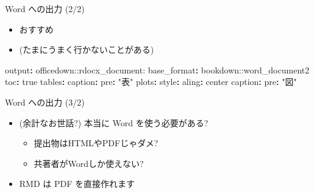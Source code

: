 \documentclass[
  ignorenonframetext,
]{beamer}
\newenvironment{Shaded}{\begin{snugshade}}{\end{snugshade}}
\newcommand{\AttributeTok}[1]{\textcolor[rgb]{0.77,0.63,0.00}{#1}}
\newcommand{\CharTok}[1]{\textcolor[rgb]{0.31,0.60,0.02}{#1}}
\newcommand{\FunctionTok}[1]{\textcolor[rgb]{0.00,0.00,0.00}{#1}}
\newcommand{\KeywordTok}[1]{\textcolor[rgb]{0.13,0.29,0.53}{\textbf{#1}}}
\newcommand{\StringTok}[1]{\textcolor[rgb]{0.31,0.60,0.02}{#1}}
\providecommand{\tightlist}{%
  \setlength{\itemsep}{0pt}\setlength{\parskip}{0pt}}
\begin{document}
\begin{frame}[fragile]{Word への出力 (2/2)}
\protect\hypertarget{word-ux3078ux306eux51faux529b-22}{}
\begin{itemize}
\tightlist
\item
  おすすめ
\item
  (たまにうまく行かないことがある)
\end{itemize}

\begin{Shaded}
\begin{Highlighting}[]
\FunctionTok{output}\KeywordTok{:}\AttributeTok{ officedown::rdocx\_document:}
\AttributeTok{  }\FunctionTok{base\_format}\KeywordTok{:}\AttributeTok{ bookdown::word\_document2}
\AttributeTok{  }\FunctionTok{toc}\KeywordTok{:}\AttributeTok{ }\CharTok{true}
\AttributeTok{    }\FunctionTok{tables}\KeywordTok{:}
\AttributeTok{      }\FunctionTok{caption}\KeywordTok{:}
\AttributeTok{        }\FunctionTok{pre}\KeywordTok{:}\AttributeTok{ }\StringTok{"表"}
\AttributeTok{    }\FunctionTok{plots}\KeywordTok{:}
\AttributeTok{      }\FunctionTok{style}\KeywordTok{:}
\AttributeTok{        }\FunctionTok{aling}\KeywordTok{:}\AttributeTok{ center}
\AttributeTok{      }\FunctionTok{caption}\KeywordTok{:}
\AttributeTok{        }\FunctionTok{pre}\KeywordTok{:}\AttributeTok{ }\StringTok{"図"}
\end{Highlighting}
\end{Shaded}
\end{frame}

\begin{frame}{Word への出力 (3/2)}
\protect\hypertarget{word-ux3078ux306eux51faux529b-32}{}
\begin{itemize}
\item
  (余計なお世話?) 本当に Word を使う必要がある?

  \begin{itemize}
  \tightlist
  \item
    提出物はHTMLやPDFじゃダメ?
  \item
    共著者がWordしか使えない?
  \end{itemize}
\item
  RMD は PDF を直接作れます
\end{itemize}
\end{frame}
\end{document}
